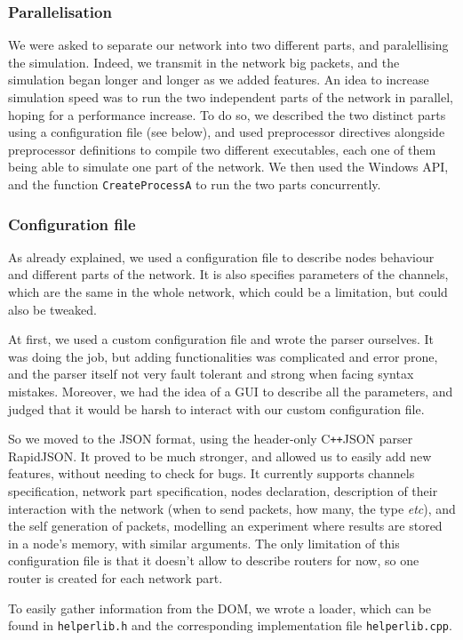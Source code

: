 \documentclass[12pt,a4paper]{article}
\newcommand{\Cpp}{C\texttt{++}}
\begin{document}
\subsubsection*{Parallelisation}
We were asked to separate our network into two different parts, and paralellising the simulation. Indeed, we transmit in the network big packets, and the simulation began longer and longer as we added features. An idea to increase simulation speed was to run the two independent parts of the network in parallel, hoping for a performance increase. To do so, we described the two distinct parts using a configuration file (see below), and used preprocessor directives alongside preprocessor definitions to compile two different executables, each one of them being able to simulate one part of the network. We then used the Windows API, and the function \texttt{CreateProcessA} to run the two parts concurrently.

\subsubsection*{Configuration file}
As already explained, we used a configuration file to describe nodes behaviour and different parts of the network. It is also specifies parameters of the channels, which are the same in the whole network, which could be a limitation, but could also be tweaked.

At first, we used a custom configuration file and wrote the parser ourselves. It was doing the job, but adding functionalities was complicated and error prone, and the parser itself not very fault tolerant and strong when facing syntax mistakes. Moreover, we had the idea of a GUI to describe all the parameters, and judged that it would be harsh to interact with our custom configuration file.

So we moved to the JSON format, using the header-only \Cpp JSON parser RapidJSON. It proved to be much stronger, and allowed us to easily add new features, without needing to check for bugs. It currently supports channels specification, network part specification, nodes declaration, description of their interaction with the network (when to send packets, how many, the type \textsl{etc}), and the self generation of packets, modelling an experiment where results are stored in a node's memory, with similar arguments. The only limitation of this configuration file is that it doesn't allow to describe routers for now, so one router is created for each network part. 

To easily gather information from the DOM, we wrote a loader, which can be found in \texttt{helperlib.h} and the corresponding implementation file \texttt{helperlib.cpp}.
\end{document}
